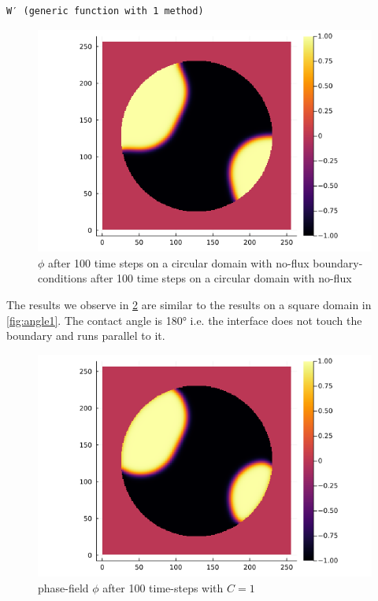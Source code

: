 \documentclass{mimosis}
\begin{document}
\label{}
\begin{verbatim}
W′ (generic function with 1 method)
\end{verbatim}



\begin{figure}[htbp]
\centering
\includegraphics[width=.9\linewidth]{images/angle0c.png}
\caption{\label{fig:angle0c}\(\phi\) after 100 time steps on a circular domain with no-flux boundary-conditions after 100 time steps on a circular domain with no-flux}
\end{figure}



The results we observe in \ref{fig:angle1c} are similar to the results on a square domain in \ref{fig:angle1}. The contact angle is 180° i.e. the interface does not touch the boundary and runs parallel to it.
\begin{figure}[htbp]
\centering
\includegraphics[width=.9\linewidth]{images/anfle1c.png}
\caption{\label{fig:angle1c}phase-field \(\phi\) after 100 time-steps with \(C=1\)}
\end{figure}
\end{document}
